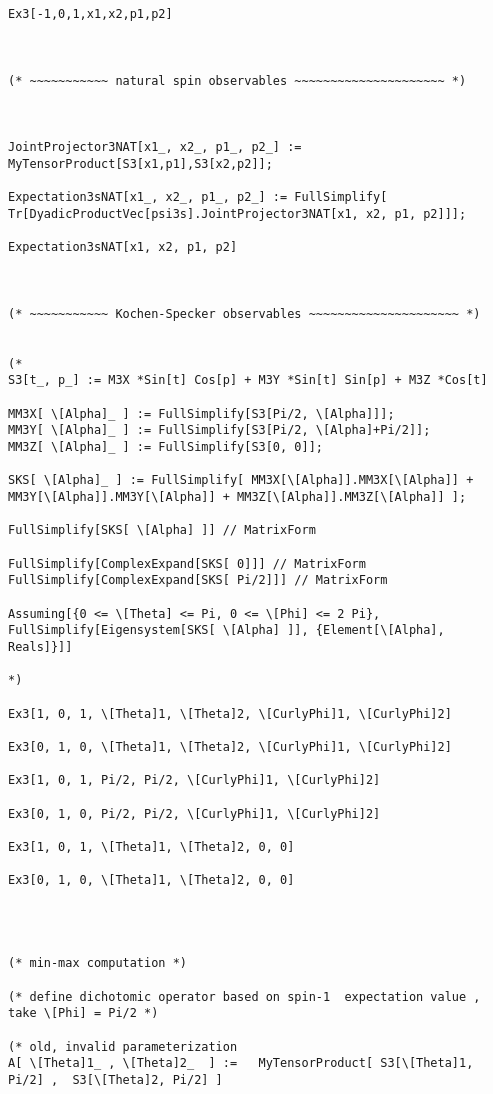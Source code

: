 \documentclass[%
  twocolumn,
 showpacs,
 showkeys,
 preprintnumbers,
 amsmath,amssymb,
 aps,
  pra,
  longbibliography,
 floatfix,
 ]{revtex4-1}
\begin{document}
{\begin{lstlisting}[backgroundcolor=\color{yellow!10},framerule=0pt,breaklines=true, frame=tb]
Ex3[-1,0,1,x1,x2,p1,p2]



(* ~~~~~~~~~~~ natural spin observables ~~~~~~~~~~~~~~~~~~~~~ *)



JointProjector3NAT[x1_, x2_, p1_, p2_] :=  MyTensorProduct[S3[x1,p1],S3[x2,p2]];

Expectation3sNAT[x1_, x2_, p1_, p2_] := FullSimplify[ Tr[DyadicProductVec[psi3s].JointProjector3NAT[x1, x2, p1, p2]]];

Expectation3sNAT[x1, x2, p1, p2]



(* ~~~~~~~~~~~ Kochen-Specker observables ~~~~~~~~~~~~~~~~~~~~~ *)


(*
S3[t_, p_] := M3X *Sin[t] Cos[p] + M3Y *Sin[t] Sin[p] + M3Z *Cos[t]

MM3X[ \[Alpha]_ ] := FullSimplify[S3[Pi/2, \[Alpha]]];
MM3Y[ \[Alpha]_ ] := FullSimplify[S3[Pi/2, \[Alpha]+Pi/2]];
MM3Z[ \[Alpha]_ ] := FullSimplify[S3[0, 0]];

SKS[ \[Alpha]_ ] := FullSimplify[ MM3X[\[Alpha]].MM3X[\[Alpha]] + MM3Y[\[Alpha]].MM3Y[\[Alpha]] + MM3Z[\[Alpha]].MM3Z[\[Alpha]] ];

FullSimplify[SKS[ \[Alpha] ]] // MatrixForm

FullSimplify[ComplexExpand[SKS[ 0]]] // MatrixForm
FullSimplify[ComplexExpand[SKS[ Pi/2]]] // MatrixForm

Assuming[{0 <= \[Theta] <= Pi, 0 <= \[Phi] <= 2 Pi}, FullSimplify[Eigensystem[SKS[ \[Alpha] ]], {Element[\[Alpha], Reals]}]]

*)

Ex3[1, 0, 1, \[Theta]1, \[Theta]2, \[CurlyPhi]1, \[CurlyPhi]2]

Ex3[0, 1, 0, \[Theta]1, \[Theta]2, \[CurlyPhi]1, \[CurlyPhi]2]

Ex3[1, 0, 1, Pi/2, Pi/2, \[CurlyPhi]1, \[CurlyPhi]2]

Ex3[0, 1, 0, Pi/2, Pi/2, \[CurlyPhi]1, \[CurlyPhi]2]

Ex3[1, 0, 1, \[Theta]1, \[Theta]2, 0, 0]

Ex3[0, 1, 0, \[Theta]1, \[Theta]2, 0, 0]




(* min-max computation *)

(* define dichotomic operator based on spin-1  expectation value , take \[Phi] = Pi/2 *)

(* old, invalid parameterization
A[ \[Theta]1_ , \[Theta]2_  ] :=   MyTensorProduct[ S3[\[Theta]1, Pi/2] ,  S3[\[Theta]2, Pi/2] ]


\end{lstlisting}}
\end{document}
